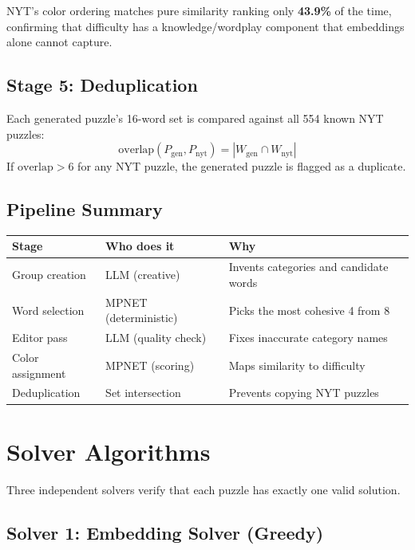 \documentclass[11pt, letterpaper]{article}
\begin{document}
NYT's color ordering matches pure similarity ranking only \textbf{43.9\%} of the time, confirming that difficulty has a knowledge/wordplay component that embeddings alone cannot capture.

\subsection{Stage 5: Deduplication}

Each generated puzzle's 16-word set is compared against all 554 known NYT puzzles:
\[
    \text{overlap}(P_\text{gen}, P_\text{nyt}) = |W_\text{gen} \cap W_\text{nyt}|
\]
If $\text{overlap} > 6$ for any NYT puzzle, the generated puzzle is flagged as a duplicate.

\subsection{Pipeline Summary}

\begin{center}
\begin{tabular}{@{}lll@{}}
\toprule
Stage & Who does it & Why \\
\midrule
Group creation & LLM (creative) & Invents categories and candidate words \\
Word selection & MPNET (deterministic) & Picks the most cohesive 4 from 8 \\
Editor pass & LLM (quality check) & Fixes inaccurate category names \\
Color assignment & MPNET (scoring) & Maps similarity to difficulty \\
Deduplication & Set intersection & Prevents copying NYT puzzles \\
\bottomrule
\end{tabular}
\end{center}

\section{Solver Algorithms}

Three independent solvers verify that each puzzle has exactly one valid solution.

\subsection{Solver 1: Embedding Solver (Greedy)}
\end{document}
